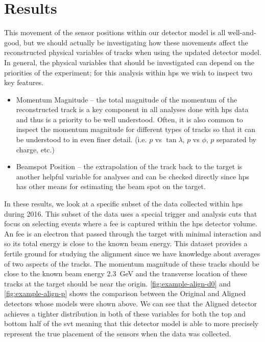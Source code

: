 \section{Results}
This movement of the sensor positions within our detector model is all well-and-good,
but we should actually be investigating how these movements affect the reconstructed
physical variables of tracks when using the updated detector model.
In general, the physical variables that should be investigated can depend on the
priorities of the experiment; for this analysis within \ac{hps} we wish to inspect
two key features.
\begin{itemize}
  \item Momentum Magnitude -- the total magnitude of the momentum of the reconstructed
    track is a key component in all analyses done with \ac{hps} data and thus is a
    priority to be well understood. Often, it is also common to inspect the momentum
    magnitude for different types of tracks so that it can be understood to in even
    finer detail. (i.e. $p$ vs $\tan\lambda$, $p$ vs $\phi$, $p$ separated by charge,
    etc.)
  \item Beamspot Position -- the extrapolation of the track back to the target is
    another helpful variable for analyses and can be checked directly since \ac{hps}
    has other means for estimating the beam spot on the target.
\end{itemize}
In these results, we look at a specific subset of the data collected within \ac{hps}
during 2016. This subset of the data uses a special trigger and analysis cuts that
focus on selecting events where a \ac{fee} is captured within the \ac{hps} detector volume.
An \ac{fee} is an electron that passed through the target with minimal interaction and
so its total energy is close to the known beam energy.
This dataset provides a fertile ground for studying the alignment since we have
knowledge about averages of two aspects of the tracks.
The momentum magnitude of these tracks should be close to the known
beam energy \qty{2.3}{\giga\electronvolt} and the transverse location of these tracks
at the target should be near the origin.
\cref{fig:example-align-d0} and \cref{fig:example-align-p} shows the comparison between
the Original and Aligned detectors whose models were shown above.
We can see that the Aligned detector achieves a tighter distribution in both of these
variables for both the top and bottom half of the \ac{svt} meaning that this detector
model is able to more precisely represent the true placement of the sensors when the
data was collected.

